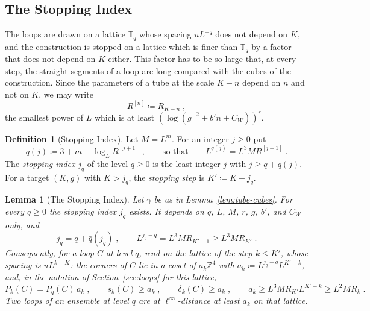 \documentclass[11pt]{preprint}
\numberwithin{equation}{section}
\newtheorem{lemma}[theorem]{Lemma}
\theoremstyle{definition}
\newtheorem{definition}[theorem]{Definition}
\theoremstyle{remark}
\theoremstyle{plain}
\begin{document}
\subsection{The Stopping Index}\label{sec:stopping-index}

The loops are drawn on a lattice $\mathbb T_q$ whose spacing $uL^{-q}$ does not depend on $K$, and the construction is stopped on a lattice which is finer than $\mathbb T_q$ by a factor that does not depend on $K$ either. This factor has to be so large that, at every step, the straight segments of a loop are long compared with the cubes of the construction. Since the parameters of a tube at the scale $K - n$ depend on $n$ and not on $K$, we may write
\begin{equation}\label{eq:cube-size-below-unit}
    R^{[n]} \coloneqq R_{K-n}\;,
\end{equation}
the smallest power of $L$ which is at least $(\log(\bar g^{-2} + b'n + C_W))^r$.

\begin{definition}[Stopping Index]\label{def:stopping-index}
Let $M = L^m$. For an integer $j \geq 0$ put
\begin{equation}\label{eq:stopping-function}
    \bar q(j) \coloneqq 3 + m + \log_LR^{[j+1]}\;,
    \qquad\text{so that}\qquad
    L^{\bar q(j)} = L^3MR^{[j+1]}\;.
\end{equation}
The \emph{stopping index} $j_q$ of the level $q \geq 0$ is the least integer $j$ with $j \geq q + \bar q(j)$. For a target $(K, \bar g)$ with $K > j_q$, the \emph{stopping step} is $K' \coloneqq K - j_q$.
\end{definition}

\begin{lemma}[The Stopping Index]\label{lem:stopping-index}
Let $\gamma$ be as in Lemma~\ref{lem:tube-cubes}. For every $q \geq 0$ the stopping index $j_q$ exists. It depends on $q$, $L$, $M$, $r$, $\bar g$, $b'$, and $C_W$ only, and
\begin{equation}\label{eq:stopping-identity-index}
    j_q = q + \bar q(j_q)\;,
    \qquad
    L^{j_q-q} = L^3MR_{K'-1} \geq L^3MR_{K'}\;.
\end{equation}
Consequently, for a loop $C$ at level $q$, read on the lattice of the step $k \leq K'$, whose spacing is $uL^{k-K}$: the corners of $C$ lie in a coset of $a_k\mathbb Z^4$ with $a_k \coloneqq L^{j_q-q}L^{K'-k}$, and, in the notation of Section~\ref{sec:loops} for this lattice,
\begin{equation}\label{eq:lengths-at-step}
    P_k(C) = P_q(C)\,a_k\;,
    \qquad
    s_k(C) \geq a_k\;,
    \qquad
    \delta_k(C) \geq a_k\;,
    \qquad
    a_k \geq L^3MR_{K'}L^{K'-k} \geq L^2MR_k\;.
\end{equation}
Two loops of an ensemble at level $q$ are at $\ell^\infty$-distance at least $a_k$ on that lattice.
\end{lemma}
\end{document}
